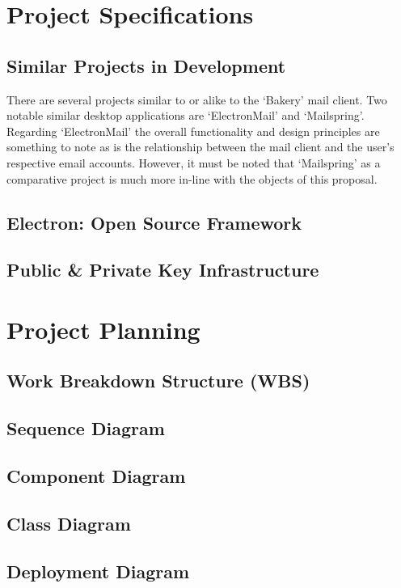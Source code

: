 \documentclass[12pt]{article}
\begin{document}
\section{Project Specifications}
	\subsection{Similar Projects in Development}
		There are several projects similar to or alike to the `Bakery' mail client. Two notable similar desktop applications are `ElectronMail'\cite{ElectronMail} and `Mailspring'\cite{Mailspring}. Regarding `ElectronMail' the overall functionality and design principles are something to note as is the relationship between the mail client and the user's respective email accounts. However, it must be noted that `Mailspring' as a comparative project is much more in-line with the objects of this proposal.
	\subsection{Electron: Open Source Framework}
		\lipsum[1]
	\subsection{Public \& Private Key Infrastructure}
		\lipsum[1]
\pagebreak
\section{Project Planning}
	\lipsum[1]
	\pagebreak
	\subsection{Work Breakdown Structure (WBS)}
	\lipsum[1]
	\pagebreak
	\subsection{Sequence Diagram}
	\lipsum[1]
	\pagebreak
	\subsection{Component Diagram}
	\lipsum[1]
	\pagebreak
	\subsection{Class Diagram}
	\lipsum[1]
	\pagebreak
	\subsection{Deployment Diagram}
	\lipsum[1]
\pagebreak


\end{document}
